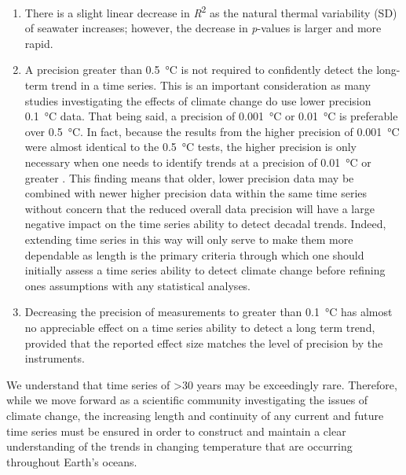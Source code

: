 \documentclass[]{ametsoc}
\begin{document}
\begin{enumerate}
\item There is a slight linear decrease in \emph{R}\textsuperscript{2} as the natural thermal variability (SD) of seawater increases; however, the decrease in \emph{p}-values is larger and more rapid.

\item A precision greater than \SI{0.5}{\degreeCelsius} is not required to confidently detect the long-term trend in a time series. This is an important consideration as many studies investigating the effects of climate change \citep[e.g.][]{Grant2010, Scherrer2010, Lathlean2012} do use lower precision \SI{0.1}{\degreeCelsius} data. That being said, a precision of \SI{0.001}{\degreeCelsius} or \SI{0.01}{\degreeCelsius} is preferable over \SI{0.5}{\degreeCelsius}. In fact, because the results from the higher precision of \SI{0.001}{\degreeCelsius} were almost identical to the \SI{0.5}{\degreeCelsius} tests, the higher precision is only necessary when one needs to identify trends at a precision of \SI{0.01}{\degreeCelsius} or greater \citep{Karl2015}. This finding means that older, lower precision data may be combined with newer higher precision data within the same time series without concern that the reduced overall data precision will have a large negative impact on the time series ability to detect decadal trends. Indeed, extending time series in this way will only serve to make them more dependable as length is the primary criteria through which one should initially assess a time series ability to detect climate change before refining ones assumptions with any statistical analyses.

\item Decreasing the precision of measurements to greater than \SI{0.1}{\degreeCelsius} has almost no appreciable effect on a time series ability to detect a long term trend, provided that the reported effect size matches the level of precision by the instruments.
\end{enumerate}

We understand that time series of \textgreater 30 years may be exceedingly rare. Therefore, while we move forward as a scientific community investigating the issues of climate change, the increasing length and continuity of any current and future time series must be ensured in order to construct and maintain a clear understanding of the trends in changing temperature that are occurring throughout Earth's oceans.

%
\end{document}

